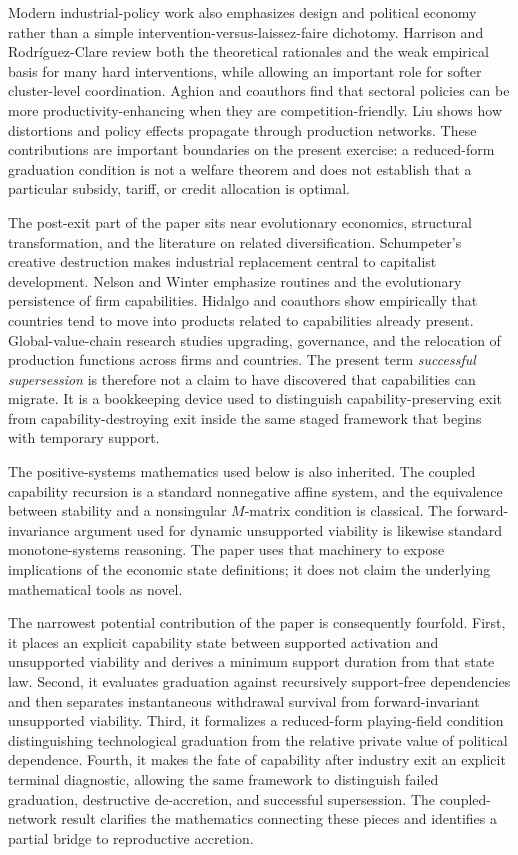 Modern industrial-policy work also emphasizes design and political economy rather than a simple intervention-versus-laissez-faire dichotomy. Harrison and Rodr\'iguez-Clare review both the theoretical rationales and the weak empirical basis for many hard interventions, while allowing an important role for softer cluster-level coordination. Aghion and coauthors find that sectoral policies can be more productivity-enhancing when they are competition-friendly. Liu shows how distortions and policy effects propagate through production networks. These contributions are important boundaries on the present exercise: a reduced-form graduation condition is not a welfare theorem and does not establish that a particular subsidy, tariff, or credit allocation is optimal.

The post-exit part of the paper sits near evolutionary economics, structural transformation, and the literature on related diversification. Schumpeter's creative destruction makes industrial replacement central to capitalist development. Nelson and Winter emphasize routines and the evolutionary persistence of firm capabilities. Hidalgo and coauthors show empirically that countries tend to move into products related to capabilities already present. Global-value-chain research studies upgrading, governance, and the relocation of production functions across firms and countries. The present term \emph{successful supersession} is therefore not a claim to have discovered that capabilities can migrate. It is a bookkeeping device used to distinguish capability-preserving exit from capability-destroying exit inside the same staged framework that begins with temporary support.

The positive-systems mathematics used below is also inherited. The coupled capability recursion is a standard nonnegative affine system, and the equivalence between stability and a nonsingular $M$-matrix condition is classical. The forward-invariance argument used for dynamic unsupported viability is likewise standard monotone-systems reasoning. The paper uses that machinery to expose implications of the economic state definitions; it does not claim the underlying mathematical tools as novel.

The narrowest potential contribution of the paper is consequently fourfold. First, it places an explicit capability state between supported activation and unsupported viability and derives a minimum support duration from that state law. Second, it evaluates graduation against recursively support-free dependencies and then separates instantaneous withdrawal survival from forward-invariant unsupported viability. Third, it formalizes a reduced-form playing-field condition distinguishing technological graduation from the relative private value of political dependence. Fourth, it makes the fate of capability after industry exit an explicit terminal diagnostic, allowing the same framework to distinguish failed graduation, destructive de-accretion, and successful supersession. The coupled-network result clarifies the mathematics connecting these pieces and identifies a partial bridge to reproductive accretion.
